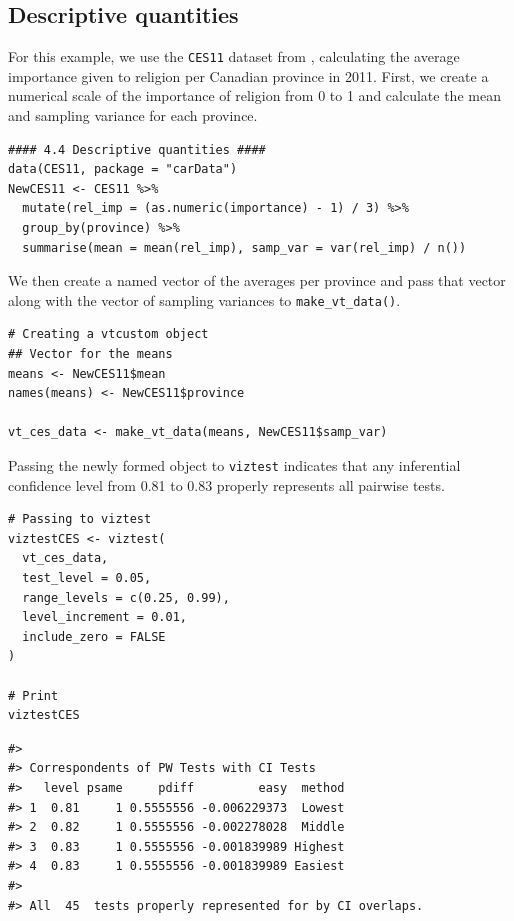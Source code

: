 \subsection{Descriptive quantities}\label{descriptive-quantities}

For this example, we use the \texttt{CES11} dataset from , calculating the average importance given to religion per Canadian province in 2011. First, we create a numerical scale of the importance of religion from 0 to 1 and calculate the mean and sampling variance for each province.

\begin{verbatim}
#### 4.4 Descriptive quantities ####
data(CES11, package = "carData")
NewCES11 <- CES11 %>%
  mutate(rel_imp = (as.numeric(importance) - 1) / 3) %>%
  group_by(province) %>%
  summarise(mean = mean(rel_imp), samp_var = var(rel_imp) / n())
\end{verbatim}

We then create a named vector of the averages per province and pass that vector along with the vector of sampling variances to \texttt{make\_vt\_data()}.

\begin{verbatim}
# Creating a vtcustom object
## Vector for the means
means <- NewCES11$mean
names(means) <- NewCES11$province

vt_ces_data <- make_vt_data(means, NewCES11$samp_var)
\end{verbatim}

Passing the newly formed object to \texttt{viztest} indicates that any inferential confidence level from 0.81 to 0.83 properly represents all pairwise tests.

\begin{verbatim}
# Passing to viztest
viztestCES <- viztest(
  vt_ces_data,
  test_level = 0.05,
  range_levels = c(0.25, 0.99),
  level_increment = 0.01,
  include_zero = FALSE
)

# Print
viztestCES
\end{verbatim}

\begin{verbatim}
#> 
#> Correspondents of PW Tests with CI Tests
#>   level psame     pdiff         easy  method
#> 1  0.81     1 0.5555556 -0.006229373  Lowest
#> 2  0.82     1 0.5555556 -0.002278028  Middle
#> 3  0.83     1 0.5555556 -0.001839989 Highest
#> 4  0.83     1 0.5555556 -0.001839989 Easiest
#> 
#> All  45  tests properly represented for by CI overlaps.
\end{verbatim}

